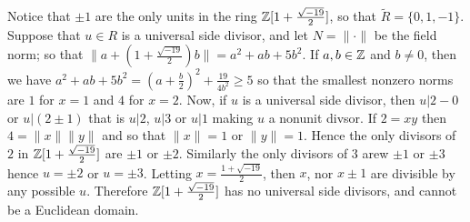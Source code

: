 \begin{example}\label{2.3}
    Notice that $\pm 1$ are the only units in the ring
    $\mathbb{Z}[1+\frac{\sqrt{-19}}{2}]$, so that $\tilde{R}=\{0,1,-1\}$. Suppose that
    $u \in R$ is a universal side divisor, and let $N=\|\cdot\|$ be the field norm;
    so that $\|a+(1+\frac{\sqrt{-19}}{2})b\|=a^2+ab+5b^2$. If $a,b \in \mathbb{Z}$ and
    $b \neq 0$, then we have $a^2+ab+5b^2=(a+\frac{b}{2})^2+\frac{19}{4b^2} \geq
    5$ so that the smallest nonzero norms are $1$ for $x=1$ and $4$ for $x=2$.
    Now, if $u$ is a universal side divisor, then  $u|2-0$ or  $u|(2 \pm 1)$
    that is $u|2$,  $u|3$ or  $u|1$ making  $u$ a nonunit divsor. If  $2=xy$
    then $4=\|x\|\|y\|$ and so that $\|x\|=1$ or  $\|y\|=1$. Hence the only
    divisors of $2$ in  $\mathbb{Z}[1+\frac{\sqrt{-19}}{2}]$ are $\pm 1$ or  $\pm 2$.
    Similarly the only divisors of  $3$ arew  $\pm 1$ or  $\pm 3$ hence  $u=\pm
    2$ or  $u=\pm 3$. Letting  $x=\frac{1+\sqrt{-19}}{2}$, then $x$, nor  $x
    \pm 1$ are divisible by any possible $u$. Therefore
    $\mathbb{Z}[1+\frac{\sqrt{-19}}{2}]$ has no universal side divisors, and cannot be a
    Euclidean domain.
    \end{example}
